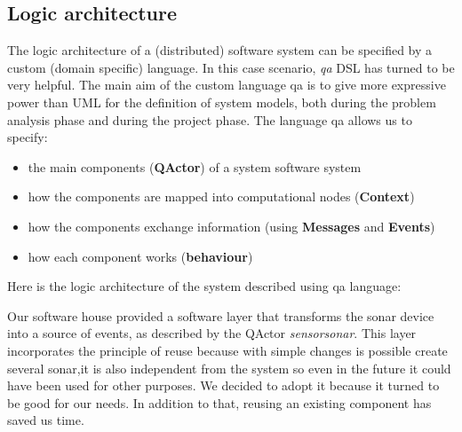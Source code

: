 \subsection{Logic architecture}
The logic architecture of a (distributed) software system can be specified by a custom (domain specific) language. In this case scenario, \textit{qa} DSL has turned to be very helpful. The main aim of the custom language qa is to give more expressive power than UML for the definition of system models, both during the problem analysis phase and during the project phase. The language qa allows us to specify:
\begin{itemize}
	\item the main components (\textbf{QActor}) of a system software system
	\item how the components are mapped into computational nodes (\textbf{Context})
	\item how the components exchange information (using \textbf{Messages} and \textbf{Events})
	\item how each component works (\textbf{behaviour})
\end{itemize}
Here is the logic architecture of the system described using qa language:

Our software house provided a software layer that transforms the sonar device into a source of events, as described by the QActor \textit{sensorsonar}. This layer incorporates the principle of reuse because with simple changes is possible create several sonar,it is also independent from the system so even in the future it could have been used for other purposes. We decided to adopt it because it turned to be good for our needs. In addition to that, reusing an existing component has saved us time.